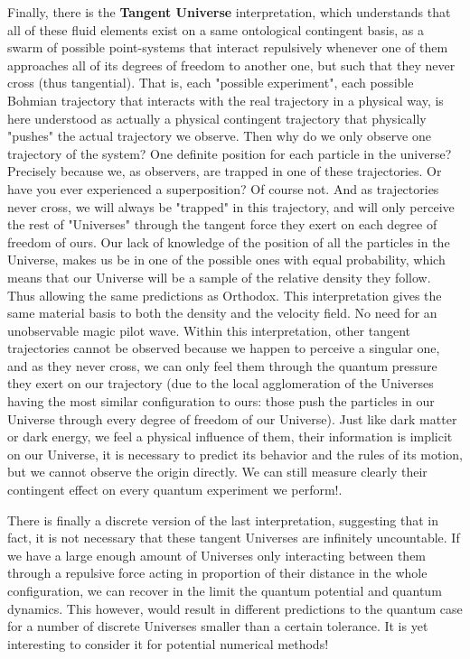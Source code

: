 \documentclass[11pt, a4paper]{article} %
\begin{document}
Finally, there is the {\bf Tangent Universe} interpretation, which understands that all of these fluid elements exist on a same ontological contingent basis, as a swarm of possible point-systems that interact repulsively whenever one of them approaches all of its degrees of freedom to another one, but such that they never cross (thus tangential). That is, each "possible experiment", each possible Bohmian trajectory that interacts with the real trajectory in a physical way, is here understood as actually a physical contingent trajectory that physically "pushes" the actual trajectory we observe. Then why do we only observe one trajectory of the system? One definite position for each particle in the universe? Precisely because we, as observers, are trapped in one of these trajectories. Or have you ever experienced a superposition? Of course not. And as trajectories never cross, we will always be "trapped" in this trajectory, and will only perceive the rest of "Universes" through the tangent force they exert on each degree of freedom of ours. Our lack of knowledge of the position of all the particles in the Universe, makes us be in one of the possible ones with equal probability, which means that our Universe will be a sample of the relative density they follow. Thus allowing the same predictions as Orthodox. This interpretation gives the same material basis to both the density and the velocity field. No need for an unobservable magic pilot wave. Within this interpretation, other tangent trajectories cannot be observed because we happen to perceive a singular one, and as they never cross, we can only feel them through the quantum pressure they exert on our trajectory (due to the local agglomeration of the Universes having the most similar configuration to ours: those push the particles in our Universe through every degree of freedom of our Universe). Just like dark matter or dark energy, we feel a physical influence of them, their information is implicit on our Universe, it is necessary to predict its behavior and the rules of its motion, but we cannot observe the origin directly. We can still measure clearly their contingent effect on every quantum experiment we perform!.

There is finally a discrete version of the last interpretation, suggesting that in fact, it is not necessary that these tangent Universes are infinitely uncountable. If we have a large enough amount of Universes only interacting between them through a repulsive force acting in proportion of their distance in the whole configuration, we can recover in the limit the quantum potential and quantum dynamics. This however, would result in different predictions to the quantum case for a number of discrete Universes smaller than a certain tolerance. It is yet interesting to consider it for potential numerical methods!
\newpage
{}
\end{document}
